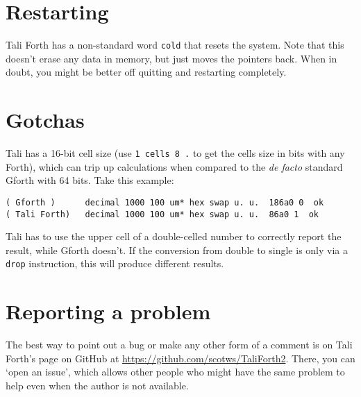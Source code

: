 \section{Restarting}

Tali Forth has a non-standard word \texttt{cold} that
resets the system. Note that this doesn't erase any data in memory, but just
moves the pointers back. When in doubt, you might be better off quitting and
restarting completely.


\section{Gotchas}

Tali has a 16-bit cell size (use \texttt{1 cells 8 \textasteriskcentered{}  .} to get the cells size in
bits with any Forth), which can trip up calculations when compared to the
\textit{de facto} standard Gforth with 64 bits. Take this example:

\begin{lstlisting}[frame=lines]
( Gforth )      decimal 1000 100 um* hex swap u. u.  186a0 0  ok
( Tali Forth)   decimal 1000 100 um* hex swap u. u.  86a0 1  ok
\end{lstlisting}

\noindent Tali has to use the upper cell of a double-celled
number to correctly report the result, while Gforth doesn't. If the conversion
from double to single is only via a \texttt{drop} instruction, this will produce
different results.



\section{Reporting a problem}

The best way to point out a bug or make any other form of a comment is on Tali
Forth's page on GitHub at
\href{https://github.com/scotws/TaliForth2}{https://github.com/scotws/TaliForth2}.
There, you can `open an issue', which allows other people who might have the
same problem to help even when the author is not available.



